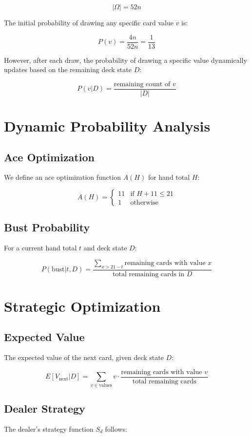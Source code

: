 \documentclass{article}
\begin{document}
\[
|\Omega| = 52n
\]

The initial probability of drawing any specific card value \( v \) is:

\[
P(v) = \frac{4n}{52n} = \frac{1}{13}
\]

However, after each draw, the probability of drawing a specific value dynamically updates based on the remaining deck state \( D \):

\[
P(v | D) = \frac{\text{remaining count of } v}{|D|}
\]

\section{Dynamic Probability Analysis}
\subsection{Ace Optimization}
We define an ace optimization function \( A(H) \) for hand total \( H \):

\[
A(H) =
\begin{cases}
    11 & \text{if } H + 11 \leq 21 \\
    1 & \text{otherwise}
\end{cases}
\]

\subsection{Bust Probability}
For a current hand total \( t \) and deck state \( D \):

\[
P(\text{bust}|t,D) = \frac{\sum_{x > 21-t} \text{remaining cards with value }x}{\text{total remaining cards in }D}
\]

\section{Strategic Optimization}
\subsection{Expected Value}
The expected value of the next card, given deck state \( D \):

\[
E[V_{\text{next}}|D] = \sum_{v \in \text{values}} v \cdot \frac{\text{remaining cards with value }v}{\text{total remaining cards}}
\]

\subsection{Dealer Strategy}
The dealer's strategy function \( S_d \) follows:
\end{document}
